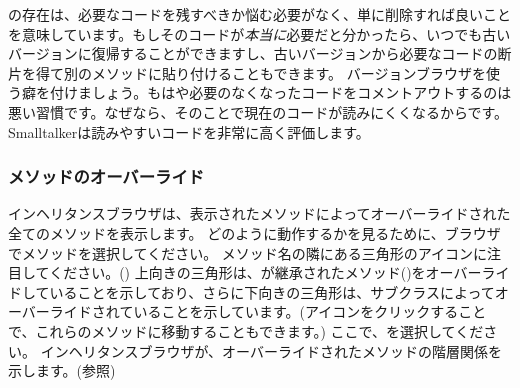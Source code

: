 \documentclass[a4paper,10pt,twoside]{book}
\begin{document}
の存在は、必要なコードを残すべきか悩む必要がなく、単に削除すれば良いことを意味しています。もしそのコードが\emph{本当に}必要だと分かったら、いつでも古いバージョンに復帰することができますし、古いバージョンから必要なコードの断片を得て別のメソッドに貼り付けることもできます。
バージョンブラウザを使う癖を付けましょう。もはや必要のなくなったコードをコメントアウトするのは悪い習慣です。なぜなら、そのことで現在のコードが読みにくくなるからです。
Smalltalkerは読みやすいコードを非常に高く評価します。


\subsubsection{メソッドのオーバーライド}

インヘリタンスブラウザは、表示されたメソッドによってオーバーライドされた全てのメソッドを表示します。
どのように動作するかを見るために、ブラウザでメソッドを選択してください。
メソッド名の隣にある三角形のアイコンに注目してください。()
上向きの三角形は、が継承されたメソッド(\ie {})をオーバーライドしていることを示しており、さらに下向きの三角形は、サブクラスによってオーバーライドされていることを示しています。(アイコンをクリックすることで、これらのメソッドに移動することもできます。)
ここで、を選択してください。
インヘリタンスブラウザが、オーバーライドされたメソッドの階層関係を示します。(参照)
\end{document}
